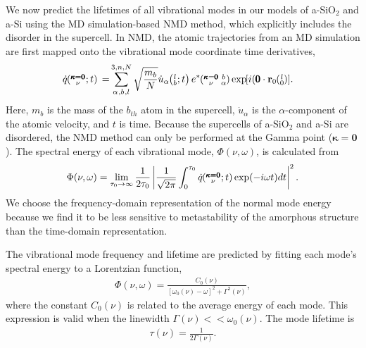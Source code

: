 We now predict the lifetimes of all vibrational modes in our 
models of a-SiO$_2$ and a-Si using the MD simulation-based NMD method,
\cite{ladd_lattice_1986,mcgaughey_quantitative_2004,henry_spectral_2008,
turney_predicting_2009,
he_heat_2011,larkin_comparison_2012,hori_phonon_2013} 
which explicitly includes the disorder in the supercell.
\cite{he_heat_2011,he_thermal_2011,he_morphology_2011,
he_lattice_2012,larkin_predicting_2013} In NMD, the 
atomic trajectories from an MD simulation are first mapped onto the 
vibrational mode coordinate time derivatives,
\cite{dove_introduction_1993}
\begin{equation}\label{EQ:qdot}
\begin{split}
\dot{q}\kgvt{}{}{}=&\SUM{0}{}\sqrt{\frac{m_b}{N}}\dot{u}_{\alpha}
\lbt e^*\kgvba\EXP{i(\pmb{0}\cdot\mathbf{r}_0\ab{l}{0}}.
\end{split}
\end{equation}
Here, $m_b$ is the mass of the $b_{th}$ atom in the supercell, 
$\dot{u}_{\alpha}$ is the $\alpha$-component 
of the atomic velocity, and $t$ is time. Because the supercells 
of a-SiO$_2$ and a-Si are disordered, the NMD method can only be 
performed at the Gamma point ($\pmb{\kappa} = \pmb{0}$). 
The spectral energy of each vibrational mode, $\Phi(\nu,\omega)$, 
is calculated from 
\begin{equation}\label{A:E:Phi_NMD}
\begin{split}
\Phi(\nu,\omega) = 
\lim_{\tau_0\rightarrow\infty}\frac{1}{2\tau_0}
\left|\frac{1}{\sqrt{2\pi}}\int_{0}^{\tau_0}\dot{q}\mspace{-4.0mu}\left(\mspace{-8.0mu} \begin{smallmatrix}&\pmb{\kappa=0} \\&\nu\end{smallmatrix} \mspace{-2.0mu};t\right)
\exp(-i\omega t)dt\right|^2.
\end{split}
\end{equation}
We choose the frequency-domain representation of the normal mode 
energy because we find it to be less sensitive to metastability 
of the amorphous structure than the time-domain representation. 

The vibrational mode frequency and lifetime are predicted by fitting 
each mode's spectral energy to a Lorentzian function, 
\begin{equation}\label{EQ:Lorentzian_NMD}
\begin{split}
\Phi(\nu,\omega) = 
\frac{C_0(\nu)}{[\omega_0(\nu)-\omega]^2+\Gamma^2(\nu)},
\end{split}
\end{equation}
where the constant $C_0(\nu)$ is related to the average energy of 
each mode. This expression is valid when the linewidth  
$\Gamma(\nu) << \omega_0(\nu)$.\cite{larkin_comparison_2012} 
The mode lifetime is\cite{ladd_lattice_1986,turney_predicting_2009} 
\begin{equation}\label{EQ:NMD_life}
\begin{split}
\tau(\nu) = \frac{1}{2\Gamma(\nu)}.
\end{split}
\end{equation}


